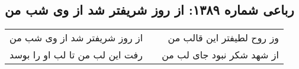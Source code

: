 \begin{center}
\section*{رباعی شماره ۱۳۸۹: از روز شریفتر شد از وی شب من}
\label{sec:1389}
\begin{longtable}{l p{0.5cm} r}
از روز شریفتر شد از وی شب من
&&
وز روح لطیفتر این قالب من
\\
رفت این لب من تا لب او را بوسد
&&
از شهد شکر نبود جای لب من
\\
\end{longtable}
\end{center}
